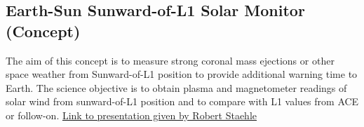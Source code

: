 \subsection{Earth-Sun Sunward-of-L1 Solar Monitor (Concept)}
\label{l1}
The aim of this concept is to measure strong coronal mass ejections or other space weather from Sunward-of-L1 position to provide additional warning time to Earth. The science objective is to obtain plasma and magnetometer readings of solar wind from sunward-of-L1 position and to compare with L1 values from ACE or follow-on. \href{http://kiss.caltech.edu/cosponsored/cubesat2012/presentations/staehle-interplanetary-cubesat-missions.pdf}{Link to presentation given by Robert Staehle}

